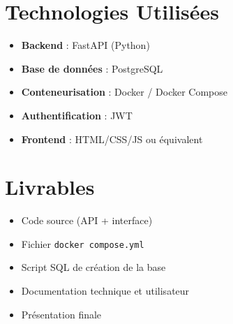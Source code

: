 \documentclass[a4paper,12pt]{article}
\begin{document}
\section{Technologies Utilisées}
\begin{itemize}
    \item \textbf{Backend} : FastAPI (Python)
    \item \textbf{Base de données} : PostgreSQL
    \item \textbf{Conteneurisation} : Docker / Docker Compose
    \item \textbf{Authentification} : JWT
    \item \textbf{Frontend} : HTML/CSS/JS ou équivalent
\end{itemize}

\section{Livrables}
\begin{itemize}
    \item Code source (API + interface)
    \item Fichier \texttt{docker compose.yml}
    \item Script SQL de création de la base
    \item Documentation technique et utilisateur
    \item Présentation finale
\end{itemize}
\end{document}
